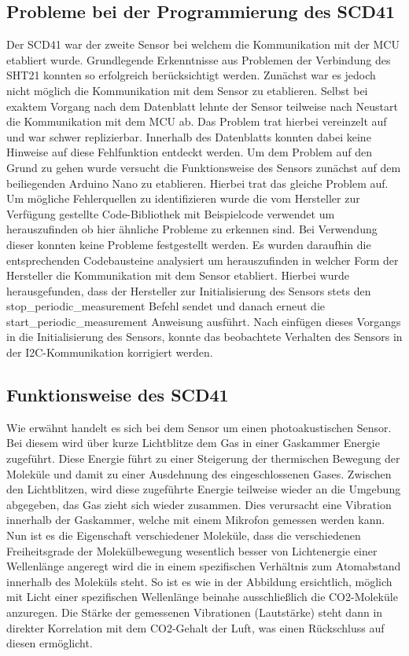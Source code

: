 \documentclass[]{article}
\begin{document}
		\subsection{Probleme bei der Programmierung des SCD41}
		Der SCD41 war der zweite Sensor bei welchem die Kommunikation mit der MCU etabliert wurde. Grundlegende Erkenntnisse aus Problemen der Verbindung des SHT21 konnten so erfolgreich berücksichtigt werden. Zunächst war es jedoch nicht möglich die Kommunikation mit dem Sensor zu etablieren. Selbst bei exaktem Vorgang nach dem Datenblatt lehnte der Sensor teilweise nach Neustart die Kommunikation mit dem MCU ab. Das Problem trat hierbei vereinzelt auf und war schwer replizierbar. Innerhalb des Datenblatts konnten dabei keine Hinweise auf diese Fehlfunktion entdeckt werden. Um dem Problem auf den Grund zu gehen wurde versucht die Funktionsweise des Sensors zunächst auf dem beiliegenden Arduino Nano zu etablieren. Hierbei trat das gleiche Problem auf. Um mögliche Fehlerquellen zu identifizieren wurde die vom Hersteller zur Verfügung gestellte Code-Bibliothek mit Beispielcode verwendet um herauszufinden ob hier ähnliche Probleme zu erkennen sind. Bei Verwendung dieser konnten keine Probleme festgestellt werden. Es wurden daraufhin die entsprechenden Codebausteine analysiert um herauszufinden in welcher Form der Hersteller die Kommunikation mit dem Sensor etabliert. Hierbei wurde herausgefunden, dass der Hersteller zur Initialisierung des Sensors stets den stop\_periodic\_measurement Befehl sendet und danach erneut die start\_periodic\_measurement Anweisung ausführt. Nach einfügen dieses Vorgangs in die Initialisierung des Sensors, konnte das beobachtete Verhalten des Sensors in der I2C-Kommunikation korrigiert werden. 
		
		\subsection{Funktionsweise des SCD41}
		Wie erwähnt handelt es sich bei dem Sensor um einen photoakustischen Sensor. Bei diesem wird über kurze Lichtblitze dem Gas in einer Gaskammer Energie zugeführt. Diese Energie führt zu einer Steigerung der thermischen Bewegung der Moleküle und damit zu einer Ausdehnung des eingeschlossenen Gases. Zwischen den Lichtblitzen, wird diese zugeführte Energie teilweise wieder an die Umgebung abgegeben, das Gas zieht sich wieder zusammen. Dies verursacht eine Vibration innerhalb der Gaskammer, welche mit einem Mikrofon gemessen werden kann. Nun ist es die Eigenschaft verschiedener Moleküle, dass die verschiedenen Freiheitsgrade der Molekülbewegung wesentlich besser von Lichtenergie einer Wellenlänge angeregt wird die in einem spezifischen Verhältnis zum Atomabstand innerhalb des Moleküls steht. So ist es wie in der Abbildung ersichtlich, möglich mit Licht einer spezifischen Wellenlänge beinahe ausschließlich die CO2-Moleküle anzuregen. Die Stärke der gemessenen Vibrationen (Lautstärke) steht dann in direkter Korrelation mit dem CO2-Gehalt der Luft, was einen Rückschluss auf diesen ermöglicht.
		
\end{document}
